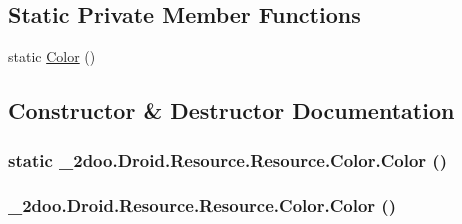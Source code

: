 \subsection*{Static Private Member Functions}
\begin{CompactItemize}
\item 
static \hyperlink{class__2doo_1_1_droid_1_1_resource_1_1_color_58c3b057412e910ba108f221d919c03f}{Color} ()
\end{CompactItemize}


\subsection{Constructor \& Destructor Documentation}
\hypertarget{class__2doo_1_1_droid_1_1_resource_1_1_color_58c3b057412e910ba108f221d919c03f}{
\subsubsection[{Color}]{\setlength{\rightskip}{0pt plus 5cm}static \_\-2doo.Droid.Resource.Resource.Color.Color ()}}
\label{class__2doo_1_1_droid_1_1_resource_1_1_color_58c3b057412e910ba108f221d919c03f}


\hypertarget{class__2doo_1_1_droid_1_1_resource_1_1_color_8a799c0372a5cf9c6da0d91d8fc0f35e}{
\subsubsection[{Color}]{\setlength{\rightskip}{0pt plus 5cm}\_\-2doo.Droid.Resource.Resource.Color.Color ()}}
\label{class__2doo_1_1_droid_1_1_resource_1_1_color_8a799c0372a5cf9c6da0d91d8fc0f35e}




